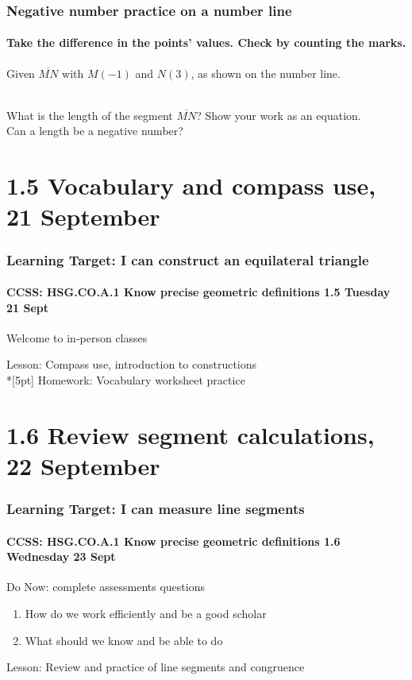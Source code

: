 \documentclass{beamer}
\begin{document}
  \frame
  {
    \frametitle{Negative number practice on a number line}
    \framesubtitle{Take the difference in the points' values. Check by counting the marks.}
    Given $\overline{MN}$ with $M(-1)$ and $N(3)$, as shown on the number line. \\[0.25cm]
       \\ \bigskip
  What is the length of the segment $\overline{MN}$? Show your work as an equation.\\[1.5cm]
  Can a length be a negative number? \vspace{2cm}  
  }

  \section{1.5 Vocabulary and compass use, 21 September}
  \frame
  {
    \frametitle{Learning Target: I can construct an equilateral triangle}
    \framesubtitle{CCSS: HSG.CO.A.1 Know precise geometric definitions  \hfill \alert{1.5 Tuesday 21 Sept}}
  
    \begin{block}{Welcome to in-person classes}
    \end{block}
    Lesson: Compass use, introduction to constructions \\*[5pt]
    Homework: Vocabulary worksheet practice 
  }

  \section{1.6 Review segment calculations, 22 September}
  \frame
  {
    \frametitle{Learning Target: I can measure line segments}
    \framesubtitle{CCSS: HSG.CO.A.1 Know precise geometric definitions  \hfill \alert{1.6 Wednesday 23 Sept}}
  
    \begin{block}{Do Now: complete assessments questions}
    \begin{enumerate}
        \item How do we work efficiently and be a good scholar
        \item What should we know and be able to do
    \end{enumerate}
    \end{block}
    Lesson: Review and practice of line segments and congruence %
  }
\end{document}

